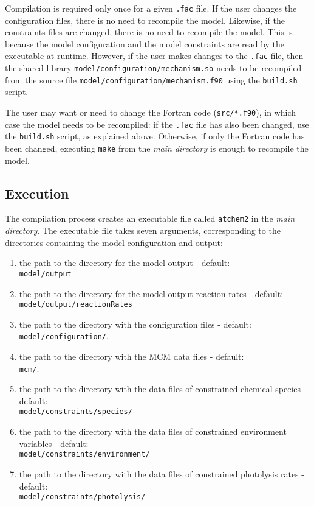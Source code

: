 Compilation is required only once for a given \texttt{.fac} file. If
the user changes the configuration files, there is no need to
recompile the model. Likewise, if the constraints files are changed,
there is no need to recompile the model. This is because the model
configuration and the model constraints are read by the executable at
runtime. However, if the user makes changes to the \texttt{.fac} file,
then the shared library \texttt{model/configuration/mechanism.so}
needs to be recompiled from the source file
\texttt{model/configuration/mechanism.f90} using the \texttt{build.sh}
script.

The user may want or need to change the Fortran code
(\texttt{src/*.f90}), in which case the model needs to be recompiled:
if the \texttt{.fac} file has also been changed, use the
\texttt{build.sh} script, as explained above. Otherwise, if only the
Fortran code has been changed, executing \texttt{make} from the
\emph{main directory} is enough to recompile the model.

\subsection{Execution} \label{subsec:execution}

The compilation process creates an executable file called
\texttt{atchem2} in the \emph{main directory}. The executable file
takes seven arguments, corresponding to the directories containing the
model configuration and output:

\begin{enumerate}
\item the path to the directory for the model output - default:\\
  \texttt{model/output}
\item the path to the directory for the model output reaction rates -
  default:\\ \texttt{model/output/reactionRates}
\item the path to the directory with the configuration files -
  default:\\ \texttt{model/configuration/}.
\item the path to the directory with the MCM data files - default:\\
  \texttt{mcm/}.
\item the path to the directory with the data files of constrained
  chemical species - default:\\ \texttt{model/constraints/species/}
\item the path to the directory with the data files of constrained
  environment variables - default:\\
  \texttt{model/constraints/environment/}
\item the path to the directory with the data files of constrained
  photolysis rates - default:\\ \texttt{model/constraints/photolysis/}
\end{enumerate}

